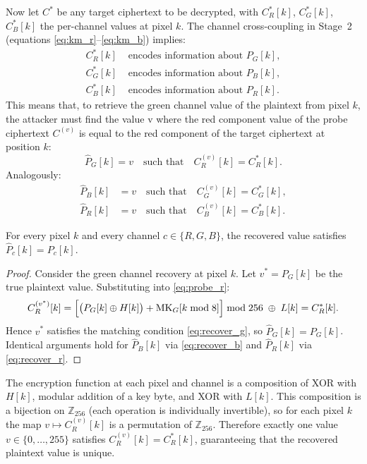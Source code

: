 Now let $C^*$ be any target ciphertext to be decrypted, with $C^*_R[k]$,
$C^*_G[k]$, $C^*_B[k]$ the per-channel values at pixel $k$. The channel
cross-coupling in Stage~2 (equations \eqref{eq:km_r}--\eqref{eq:km_b}) implies:
\begin{align}
  C^*_R[k] &\text{ encodes information about } P_G[k], \label{eq:cross_r}\\
  C^*_G[k] &\text{ encodes information about } P_B[k], \label{eq:cross_g}\\
  C^*_B[k] &\text{ encodes information about } P_R[k]. \label{eq:cross_b}
\end{align}
This means that, to retrieve the green channel value of the plaintext from
pixel $k$, the attacker must find the value v where the red component value of the
probe ciphertext  $C^{(v)}$  is equal to the red component of the target ciphertext
at position $k$:
\begin{equation}
  \hat{P}_G[k] = v \quad \text{such that} \quad C^{(v)}_R[k] = C^*_R[k].
  \label{eq:recover_g}
\end{equation}
Analogously:
\begin{align}
  \hat{P}_B[k] &= v \quad \text{such that} \quad C^{(v)}_G[k] = C^*_G[k],
  \label{eq:recover_b}\\
  \hat{P}_R[k] &= v \quad \text{such that} \quad C^{(v)}_B[k] = C^*_B[k].
  \label{eq:recover_r}
\end{align}

\begin{proposition}
For every pixel $k$ and every channel $c \in \{R,G,B\}$, the recovered value
satisfies $\hat{P}_c[k] = P_c[k]$.
\end{proposition}

\begin{proof}
Consider the green channel recovery at pixel $k$. Let $v^* = P_G[k]$ be the
true plaintext value. Substituting into \eqref{eq:probe_r}:
\begin{equation}
  C^{(v^*)}_R[k]
    = \Bigl[\bigl(P_G[k] \oplus H[k]\bigr) + \mathrm{MK}_G[k \bmod 8]\Bigr]
      \bmod 256 \;\oplus\; L[k]
    = C^*_R[k].
\end{equation}
Hence $v^*$ satisfies the matching condition \eqref{eq:recover_g}, so
$\hat{P}_G[k] = P_G[k]$. Identical arguments hold for $\hat{P}_B[k]$ via
\eqref{eq:recover_b} and $\hat{P}_R[k]$ via \eqref{eq:recover_r}.
\end{proof}

The encryption function at each pixel and channel is a composition of XOR with
$H[k]$, modular addition of a key byte, and XOR with $L[k]$. This composition
is a bijection on $\mathbb{Z}_{256}$ (each operation is individually
invertible), so for each pixel $k$ the map $v \mapsto C^{(v)}_R[k]$ is a
permutation of $\mathbb{Z}_{256}$. Therefore exactly one value
$v \in \{0,\ldots,255\}$ satisfies $C^{(v)}_R[k] = C^*_R[k]$, guaranteeing
that the recovered plaintext value is unique.

